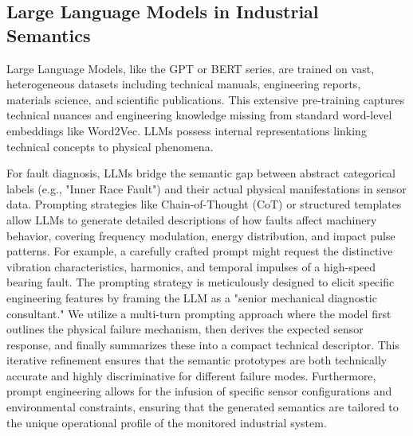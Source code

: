 \documentclass[journal]{IEEEtran}
\begin{document}
\subsection{Large Language Models in Industrial Semantics}
Large Language Models, like the GPT or BERT series, are trained on vast, heterogeneous datasets including technical manuals, engineering reports, materials science, and scientific publications. This extensive pre-training captures technical nuances and engineering knowledge missing from standard word-level embeddings like Word2Vec. LLMs possess internal representations linking technical concepts to physical phenomena.

For fault diagnosis, LLMs bridge the semantic gap between abstract categorical labels (e.g., "Inner Race Fault") and their actual physical manifestations in sensor data. Prompting strategies like Chain-of-Thought (CoT) or structured templates allow LLMs to generate detailed descriptions of how faults affect machinery behavior, covering frequency modulation, energy distribution, and impact pulse patterns. For example, a carefully crafted prompt might request the distinctive vibration characteristics, harmonics, and temporal impulses of a high-speed bearing fault. The prompting strategy is meticulously designed to elicit specific engineering features by framing the LLM as a "senior mechanical diagnostic consultant." We utilize a multi-turn prompting approach where the model first outlines the physical failure mechanism, then derives the expected sensor response, and finally summarizes these into a compact technical descriptor. This iterative refinement ensures that the semantic prototypes are both technically accurate and highly discriminative for different failure modes. Furthermore, prompt engineering allows for the infusion of specific sensor configurations and environmental constraints, ensuring that the generated semantics are tailored to the unique operational profile of the monitored industrial system.
\end{document}
